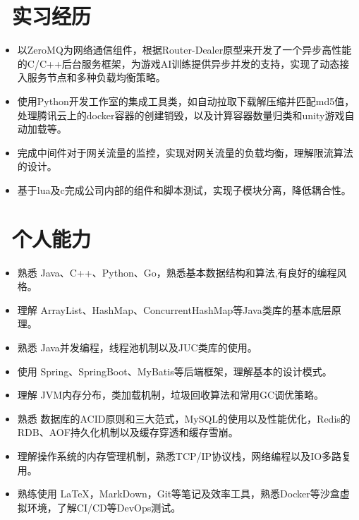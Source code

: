 \documentclass{resume}
\begin{document}
\section{\faSitemap\ 实习经历}
\vspace{-0.5ex}
\begin{onehalfspacing}
\begin{itemize}
  \item 以ZeroMQ为网络通信组件，根据Router-Dealer原型来开发了一个异步高性能的C/C++后台服务框架，为游戏AI训练提供异步并发的支持，实现了动态接入服务节点和多种负载均衡策略。
  \item 使用Python开发工作室的集成工具类，如自动拉取下载解压缩并匹配md5值，处理腾讯云上的docker容器的创建销毁，以及计算容器数量归类和unity游戏自动加载等。
\end{itemize}
\end{onehalfspacing}

\vspace{-0.5ex}
\begin{onehalfspacing}
\begin{itemize}
  \item 完成中间件对于网关流量的监控，实现对网关流量的负载均衡，理解限流算法的设计。
  \item 基于lua及c完成公司内部的组件和脚本测试，实现子模块分离，降低耦合性。
\end{itemize}
\end{onehalfspacing}

\vspace{-1.5ex}

\section{\faCogs\ 个人能力}
\begin{itemize}[parsep=0.5ex]
  \item 熟悉 Java、C++、Python、Go，熟悉基本数据结构和算法,有良好的编程风格。
  \item 理解 ArrayList、HashMap、ConcurrentHashMap等Java类库的基本底层原理。
  \item 熟悉 Java并发编程，线程池机制以及JUC类库的使用。
  \item 使用 Spring、SpringBoot、MyBatis等后端框架，理解基本的设计模式。
  \item 理解 JVM内存分布，类加载机制，垃圾回收算法和常用GC调优策略。
  \item 熟悉 数据库的ACID原则和三大范式，MySQL的使用以及性能优化，Redis的RDB、AOF持久化机制以及缓存穿透和缓存雪崩。
  \item 理解操作系统的内存管理机制，熟悉TCP/IP协议栈，网络编程以及IO多路复用。
  \item 熟练使用 \LaTeX，MarkDown，Git等笔记及效率工具，熟悉Docker等沙盒虚拟环境，了解CI/CD等DevOps测试。
\end{itemize}
\end{document}

